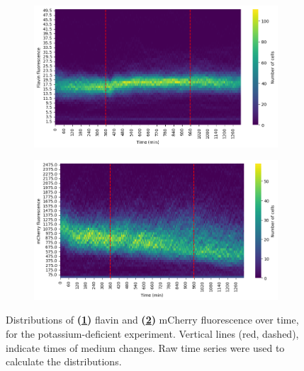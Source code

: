 \begin{figure}
  \centering
  \begin{subfigure}[htpb]{0.5\textwidth}
   \centering
   \includegraphics[width=\textwidth]{613_distribs_flavin.png}
   \caption{
   }
   \label{fig:biology-kdeficient-histogram-flavin}
  \end{subfigure}%
  \begin{subfigure}[htpb]{0.5\textwidth}
   \centering
   \includegraphics[width=\textwidth]{613_distribs_mCherry.png}
   \caption{
   }
   \label{fig:biology-kdeficient-histogram-mCherry}
  \end{subfigure}

  \caption[
    Distributions of flavin and mCherry fluorescence over time, for the potassium-deficient experiment.
  ]{
    Distributions of \textbf{(\ref{fig:biology-kdeficient-histogram-flavin})} flavin and \textbf{(\ref{fig:biology-kdeficient-histogram-mCherry})} mCherry fluorescence over time, for the potassium-deficient experiment.
    Vertical lines (red, dashed), indicate times of medium changes.
    Raw time series were used to calculate the distributions.
  }
  \label{fig:biology-kdeficient-histogram}
\end{figure}


